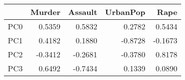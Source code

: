 \begin{tabular}{lrrrr}
\toprule
{} &  Murder &  Assault &  UrbanPop &    Rape \\
\midrule
PC0 &  0.5359 &   0.5832 &    0.2782 &  0.5434 \\
PC1 &  0.4182 &   0.1880 &   -0.8728 & -0.1673 \\
PC2 & -0.3412 &  -0.2681 &   -0.3780 &  0.8178 \\
PC3 &  0.6492 &  -0.7434 &    0.1339 &  0.0890 \\
\bottomrule
\end{tabular}
